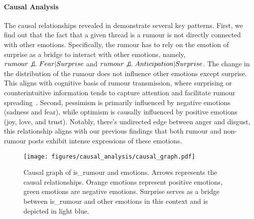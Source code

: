 \paragraph{Causal Analysis}
The causal relationships revealed in  demonstrate several key patterns. First, we find out that the fact that a given thread is a rumour is not directly connected with other emotions. Specifically, the rumour has to rely on the emotion of surprise as a bridge to interact with other emotions, namely, $rumour \not \perp\!\!\!\perp Fear | Surprise$ and $rumour \not \perp\!\!\!\perp Anticipation | Surprise$. The change in the distribution of the rumour does not influence other emotions except surprise. This aligns with cognitive basis of rumour transmission, where surprising or counterintuitive information tends to capture attention and facilitate rumour spreading~\citep{Knapp1944APO,llport1947ThePO}.
Second, pessimism is primarily influenced by negative emotions (sadness and fear), while optimism is causally influenced by positive emotions (joy, love, and trust). Notably, there's undirected edge between anger and disgust, this relationship aligns with our previous findings that both rumour and non-rumour posts exhibit intense expressions of these emotions.


\begin{figure}[t!]
    \centering
    \texttt{[image: figures/causal\_analysis/causal\_graph.pdf]}
    \caption{Causal graph of is\_rumour and emotions. Arrows represents the causal relationships. Orange emotions represent positive emotions, green emotions are negative emotions. Surprise serves as a bridge between is\_rumour and other emotions in this context and is depicted in light blue.}
\label{fig:causal graph}
\end{figure}

